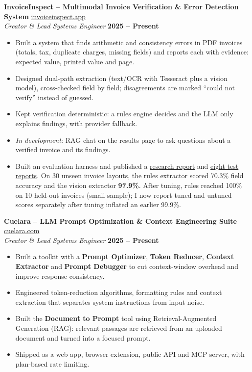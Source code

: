 \documentclass[a4paper,10pt]{article}
\begin{document}
\noindent \textbf{InvoiceInspect -- Multimodal Invoice Verification \& Error Detection System} \hfill \href{https://invoiceinspect.app}{invoiceinspect.app} \\
\textit{Creator \& Lead Systems Engineer} \hfill \textbf{2025 -- Present}
\begin{itemize}
    \item Built a system that finds arithmetic and consistency errors in PDF invoices (totals, tax, duplicate charges, missing fields) and reports each with evidence: expected value, printed value and page.
    \item Designed dual-path extraction (text/OCR with Tesseract plus a vision model), cross-checked field by field; disagreements are marked ``could not verify'' instead of guessed.
    \item Kept verification deterministic: a rules engine decides and the LLM only explains findings, with provider fallback.
    \item \textit{In development:} RAG chat on the results page to ask questions about a verified invoice and its findings.
    \item Built an evaluation harness and published a \href{https://invoiceinspect.app/research/InvoiceInspect-Research-Report.pdf}{research report} and \href{https://invoiceinspect.app/eval-harness-reports}{eight test reports}. On 30 unseen invoice layouts, the rules extractor scored 70.3\% field accuracy and the vision extractor \textbf{97.9\%}. After tuning, rules reached 100\% on 10 held-out invoices (small sample); I now report tuned and untuned scores separately after tuning inflated an earlier 99.9\%.
\end{itemize}

\vspace{6pt}

\noindent \textbf{Cuelara -- LLM Prompt Optimization \& Context Engineering Suite} \hfill \href{https://cuelara.com}{cuelara.com} \\
\textit{Creator \& Lead Systems Engineer} \hfill \textbf{2025 -- Present}
\begin{itemize}
    \item Built a toolkit with a \textbf{Prompt Optimizer}, \textbf{Token Reducer}, \textbf{Context Extractor} and \textbf{Prompt Debugger} to cut context-window overhead and improve response consistency.
    \item Engineered token-reduction algorithms, formatting rules and context extraction that separates system instructions from input noise.
    \item Built the \textbf{Document to Prompt} tool using Retrieval-Augmented Generation (RAG): relevant passages are retrieved from an uploaded document and turned into a focused prompt.
    \item Shipped as a web app, browser extension, public API and MCP server, with plan-based rate limiting.
\end{itemize}
\end{document}
